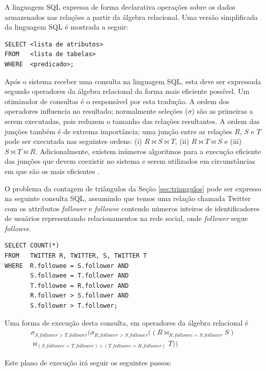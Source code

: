 A linguagem SQL expressa de forma declarativa operações sobre os dados
armazenados nas relações a partir da álgebra relacional. Uma versão simplificada
da linguagem SQL é mostrada a seguir:

\begin{lstlisting}[style=MySQLStyle]
SELECT <lista de atributos>
FROM   <lista de tabelas>
WHERE  <predicado>;
\end{lstlisting}

Após o sistema receber uma consulta na linguagem SQL, esta deve ser expressada
segundo operadores da álgebra relacional da forma mais eficiente possível. Um 
otimizador de consultas é o responsável por esta tradução. A ordem dos operadores
influencia no resultado; normalmente seleções ($\sigma$) são as primeiras a serem
executadas, pois reduzem o tamanho das relações resultantes. A ordem das junções
também é de extrema importância; uma junção entre as relações $R$, $S$ e $T$ pode
ser executada nas seguintes ordens: (i) $R \bowtie S \bowtie T$, (ii) 
$R \bowtie T \bowtie S$ e (iii) $S \bowtie T \bowtie R$. Adicionalmente, existem
inúmeros algoritmos para a execução eficiente das junções que devem coexistir no
sistema e serem utilizados em circunstâncias em que são os mais eficientes 
\cite{Mishra1992}.

O problema da contagem de triângulos da Seção \ref{sec:triangulos} pode ser expresso na 
seguinte consulta SQL, assumindo que temos uma relação chamada Twitter com os attributos
\emph{follower} e \emph{followee} contendo números inteiros de identificadores de usuários
representando relacionamentos na rede social, onde \emph{follower} segue \emph{followee}.

\begin{lstlisting}[style=MySQLStyle]
SELECT COUNT(*) 
FROM   TWITTER R, TWITTER, S, TWITTER T
WHERE  R.followee = S.follower AND
       S.followee = T.follower AND
       T.followee = R.follower AND
       R.follower > S.follower AND
       S.follower > T.follower;
\end{lstlisting}

Uma forma de execução desta consulta, em operadores da álgebra relacional é 
\begin{multline}
\sigma_{S.follower > T.follower}(\sigma_{R.follower > S.follower}(( R \bowtie_{R.followee = S.follower} S ) \\
\bowtie_{(S.followee = T.follower) \land (T.followee = R.follower)} T))
\end{multline}

Este plano de execução irá seguir os seguintes passos:

